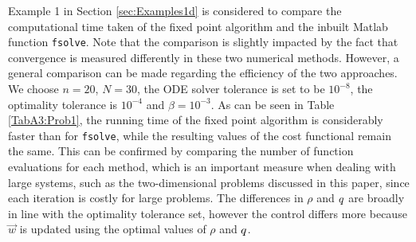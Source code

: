 
Example 1 in Section \ref{sec:Examples1d} is considered to compare the computational time taken of the fixed point algorithm and the inbuilt Matlab function \texttt{fsolve}. Note that the comparison is slightly impacted by the fact that convergence is measured differently in these two numerical methods. However, a general comparison can be made regarding the efficiency of the two approaches.
We choose $n=20$, $N=30$, the ODE solver tolerance is set to be $10^{-8}$, the optimality tolerance is $10^{-4}$ and $\beta = 10^{-3}$. 
As can be seen in Table \ref{TabA3:Prob1}, the running time of the fixed point algorithm is considerably faster than for \texttt{fsolve}, while the resulting values of the cost functional remain the same. This can be confirmed by comparing the number of function evaluations for each method, which is an important measure when dealing with large systems, such as the two-dimensional problems discussed in this paper, since each iteration is costly for large problems. The differences in $\rho$ and $q$ are broadly in line with the optimality tolerance set, however the control differs more because $\vec{w}$ is updated using the optimal values of $\rho$ and $q$. 
%
